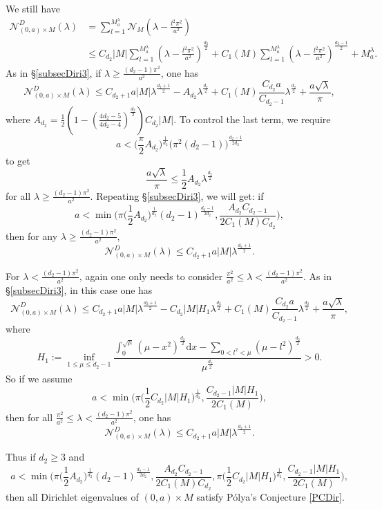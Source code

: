 \documentclass[11pt,letterpaper]{amsart}
\numberwithin{equation}{section}
\theoremstyle{plain}
\theoremstyle{plain}
\numberwithin{equation}{section}
\theoremstyle{remark}
\begin{document}
	We still have
	\[
	\begin{aligned}
		\mathcal N^D_{(0,a)\times M}(\lambda)
		&=\sum_{l=1}^{M^\lambda_a}\mathcal N_M(\lambda-\frac{l^2\pi^2}{a^2}) \\
		&\le C_{d_2}|M|\sum_{l=1}^{M^\lambda_a} (\lambda-\frac{l^2\pi^2}{a^2})^{\frac{d_2}{2}}+ C_1(M)\sum_{l=1}^{M^\lambda_a}(\lambda-\frac{l^2\pi^2}{a^2})^{\frac{d_2-1}{2}}+ M^\lambda_a.
	\end{aligned}
	\]
	As in \S\ref{subsecDiri3}, if $\lambda\ge \frac{(d_2-1)\pi^2}{a^2}$, one has
	\[
	\mathcal N^D_{(0,a)\times M}(\lambda) 
	\le C_{d_2+1}a|M|\lambda^{\frac{d_2+1}{2}}- A_{d_2}\lambda^{\frac{d_2}{2}}+ C_1(M)\frac{C_{d_2}a}{C_{d_2-1}}\lambda^{\frac{d_2}{2}}+ \frac{a\sqrt \lambda}{\pi}, 
	\]
	where $A_{d_2}= \frac{1}{2}(1-(\frac{4d_2-5}{4d_2-4})^{\frac{d_2}{2}})C_{d_2}|M|$.
	To control the last term,  we require 
	\[
	a< \big(\frac{\pi}{2} A_{d_2}\big)^{\frac{1}{d_2}}\big( \pi^2 (d_2-1)\big)^{\frac{d_2-1}{2d_2}} 
	\]
	to get
	\[\frac{a\sqrt\lambda}{\pi}\le \frac{1}{2}A_{d_2}\lambda^{\frac{d_2}{2}}\]
	for all $\lambda\ge \frac{(d_2-1)\pi^2}{a^2}$. Repeating  \S\ref{subsecDiri3}, we will get: if 
	\[
	a<\min \bigg(\pi \big(\frac{1}{2} A_{d_2}\big)^{\frac{1}{d_2}}(d_2-1)^{\frac{d_2-1}{2d_2}}, \frac{A_{d_2}C_{d_2-1}}{2 C_1(M)C_{d_2}}\bigg),
	\]
	then for any $\lambda\ge \frac{(d_2-1)\pi^2}{a^2}$,  
	\[
	\mathcal N^D_{(0,a)\times M}(\lambda)\le C_{d_2+1}a|M|\lambda^{\frac{d_2+1}{2}}. 
	\]
	
	For $\lambda < \frac{(d_2-1)\pi^2}{a^2}$, again one only needs to consider $\frac{\pi^2}{a^2}\le\lambda< \frac{(d_2-1)\pi^2}{a^2}$. As in  \S\ref{subsecDiri3}, in this case one has
	\[
	\mathcal N^D_{(0,a)\times M}(\lambda)
	\le C_{d_2+1}a|M|\lambda^{\frac{d_2+1}{2}}-C_{d_2}|M|H_1\lambda^{\frac{d_2}{2}}+C_1(M)\frac{C_{d_2}a}{C_{d_2-1}}\lambda^{\frac{d_2}{2}}+\frac{a\sqrt\lambda}{\pi},
	\]
	where 
	\[
	H_1:=\inf_{1\le \mu \le d_2-1} \frac{\int^{\sqrt\mu}_0 (\mu- x^2)^{\frac{d_2}{2}} \mathrm{d}x- \sum_{0<l^2< \mu} (\mu- l^2)^{\frac{d_2}{2}}}{\mu^{\frac{d_2}{2}}}>0.
	\]
	So if we assume  
	\[
	a<\min \bigg( \pi\big(\frac{1}{2}C_{d_2}|M| H_1\big)^{\frac{1}{d_2}},\frac{C_{d_2-1}|M|H_1}{2 C_1(M)} \bigg),
	\]
	then for all $\frac{\pi^2}{a^2}\le\lambda< \frac{(d_2-1)\pi^2}{a^2}$, one has
	\[
	\mathcal N^D_{(0,a)\times M}(\lambda)\le C_{d_2+1}a|M|\lambda^{\frac{d_2+1}{2}}. 
	\]
	
	Thus if $d_2\ge 3$ and 
	\[
	a< \min\bigg(\pi \big(\frac{1}{2} A_{d_2}\big)^{\frac{1}{d_2}}(d_2-1)^{\frac{d_2-1}{2d_2}}, \frac{A_{d_2}C_{d_2-1}}{2 C_1(M)C_{d_2}}, \pi\big(\frac{1}{2}C_{d_2}|M| H_1\big)^{\frac{1}{d_2}},\frac{C_{d_2-1}|M|H_1}{2 C_1(M)}  \bigg),
	\]
	then all Dirichlet eigenvalues of $(0,a)\times M$ satisfy P\'olya's Conjecture \eqref{PCDir}.
	
\end{document}
